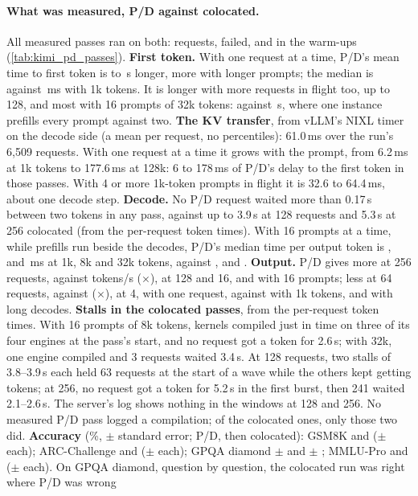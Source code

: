 \paragraph{What was measured, P/D against colocated.} All \TriKpdPasses{} measured passes ran on both: \TriKpdRequests{} requests, \TriKpdFailed{} failed, and \TriKpdWarmFailed{} in the warm-ups (\cref{tab:kimi_pd_passes}). \textbf{First token.} With one request at a time, P/D's mean time to first token is \TriKpdOneTtftGapLo{} to \TriKpdOneTtftGapHi\,s longer, more with longer prompts; the median is \TriKpdOneTtft{} against \TriKpdOneTtftCo\,ms with 1k tokens. It is longer with more requests in flight too, up to 128, and most with 16 prompts of 32k tokens: \TriKpdCtxThirtyTwoSixteenTtft{} against \TriKpdCtxThirtyTwoSixteenTtftCo\,s, where one instance prefills every prompt against two. \textbf{The KV transfer}, from vLLM's NIXL timer on the decode side (a mean per request, no percentiles): 61.0\,ms over the run's 6,509 requests. With one request at a time it grows with the prompt, from 6.2\,ms at 1k tokens to 177.6\,ms at 128k: 6 to 178\,ms of P/D's delay to the first token in those passes. With 4 or more 1k-token prompts in flight it is 32.6 to 64.4\,ms, about one decode step. \textbf{Decode.} No P/D request waited more than 0.17\,s between two tokens in any pass, against up to 3.9\,s at 128 requests and 5.3\,s at 256 colocated (from the per-request token times). With 16 prompts at a time, while prefills run beside the decodes, P/D's median time per output token is \TriKpdCtxOneSixteenTpot, \TriKpdCtxEightSixteenTpot{} and \TriKpdCtxThirtyTwoSixteenTpot\,ms at 1k, 8k and 32k tokens, against \TriKpdCtxOneSixteenTpotCo, \TriKpdCtxEightSixteenTpotCo{} and \TriKpdCtxThirtyTwoSixteenTpotCo. \textbf{Output.} P/D gives more at 256 requests, \TriKpdTwoFiftySixTok{} against \TriKpdTwoFiftySixTokCo{} tokens/s (\TriKpdTwoFiftySixRatio$\times$), at 128 and 16, and with 16 prompts; less at 64 requests, \TriKpdSixtyFourTok{} against \TriKpdSixtyFourTokCo{} (\TriKpdSixtyFourRatio$\times$), at 4, with one request, \TriKpdOneTok{} against \TriKpdOneTokCo{} with 1k tokens, and with long decodes. \textbf{Stalls in the colocated passes}, from the per-request token times. With 16 prompts of 8k tokens, kernels compiled just in time on three of its four engines at the pass's start, and no request got a token for 2.6\,s; with 32k, one engine compiled and 3 requests waited 3.4\,s. At 128 requests, two stalls of 3.8--3.9\,s each held 63 requests at the start of a wave while the others kept getting tokens; at 256, no request got a token for 5.2\,s in the first burst, then 241 waited 2.1--2.6\,s. The server's log shows nothing in the windows at 128 and 256. No measured P/D pass logged a compilation; of the colocated ones, only those two did. \textbf{Accuracy} (\%, $\pm$ standard error; P/D, then colocated): GSM8K \TriKpdGsm{} and \TriKpdGsmCo{} ($\pm$ \TriKpdGsmErr{} each); ARC-Challenge \TriKpdArc{} and \TriKpdArcCo{} ($\pm$ \TriKpdArcErr{} each); GPQA diamond \TriKpdGpqa{} $\pm$ \TriKpdGpqaErr{} and \TriKpdGpqaCo{} $\pm$ \TriKpdGpqaErrCo; MMLU-Pro \TriKpdMmlu{} and \TriKpdMmluCo{} ($\pm$ \TriKpdMmluErr{} each). On GPQA diamond, question by question, the colocated run was right where P/D was wrong \TriKpdGpqaOnlyCo{} 